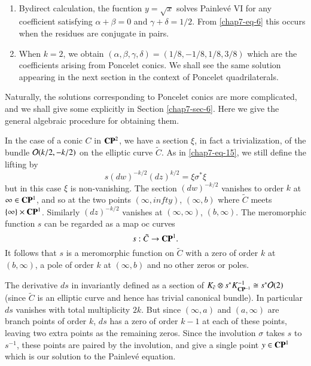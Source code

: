 \medskip
\begin{remarks*}
~
\begin{enumerate}[1.]
\item By\pageoriginale direct calculation, the fucntion $y=\sqrt{x}$ solves Painlev\'e VI for any coefficient satisfying $\alpha + \beta = 0$ and $\gamma +\delta =1/2$. From \eqref{chap7-eq-6} this occurs when the residues are conjugate in pairs.

\item When $k=2$, we obtain $(\alpha, \beta, \gamma, \delta) = (1/8, -1/8, 1/8, 3/8)$ which are the coefficients arising from Poncelet conics. We shall see the same solution appearing in the next section in the context of Poncelet quadrilaterals.
\end{enumerate}
\end{remarks*}

\noindent
Naturally, the solutions corresponding to Poncelet conics are more complicated, and we shall give some explicitly in Section \ref{chap7-sec-6}. Here we give the general algebraic procedure for obtaining them.

In the case of a conic $C$ in $\mathbf{C}\mathbf{P}^{2}$, we have a section $\xi$, in fact a trivialization, of the bundle $\mathcal{O}(k/2, -k/2)$ on the elliptic curve $\tilde{C}$. As in \eqref{chap7-eq-15}, we still define the lifting by
$$
s(dw)^{-k/2}(dz)^{k/2}=\xi\sigma^{*}\xi
$$
but in this case $\xi$ is non-vanishing. The section $(dw)^{-k/2}$ vanishes to order $k$ at $\infty \in \mathbf{C}\mathbf{P}^{1}$, and so at the two points $(\infty, infty)$, $(\infty, b)$ where $\tilde{C}$ meets $\{\infty\} \times \mathbf{C}\mathbf{P}^{1}$. Similarly $(dz)^{-k/2}$ vanishes at $(\infty, \infty)$, $(b, \infty)$. The meromorphic function $s$ can be regarded as a map oc curves
$$
s:\tilde{C}\rightarrow \mathbf{C}\mathbf{P}^{1}.
$$
It follows that $s$ is a meromorphic function on $\tilde{C}$ with a zero of order $k$ at $(b, \infty)$, a pole of order $k$ at $(\infty, b)$ and no other zeros or poles.

The derivative $ds$ in  invariantly defined as a section of $K_{\tilde{c}} \otimes s^{*}K_{\mathbf{C}\mathbf{P}^{-1}}^{-1} \cong s^{*}\mathcal{O}(2)$ (since $\tilde{C}$ is an elliptic curve and hence has trivial canonical bundle). In particular $ds$ vanishes with total multiplicity $2k$. But since $(\infty, a)$ and $(a, \infty)$ are branch points of order $k$, $ds$ has a zero of order $k-1$ at each of these points, leaving two extra points as the remaining zeros. Since the involution $\sigma$ takes $s$ to $s^{-1}$, these points are paired by the involution, and give a single point $y \in \mathbf{C}\mathbf{P}^{1}$ which is our solution to the Painlev\'e equation.

